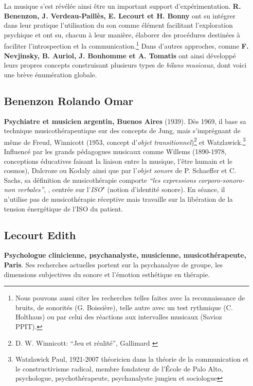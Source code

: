 	 La musique s'est révélée ainsi être un important support
         d'expérimentation. \textbf{R. Benenzon, J. Verdeau-Paillès, E.
         Lecourt et H. Bonny} ont su intégrer dans leur pratique l'utilisation du son comme
         élément facilitant l'exploration psychique et 
         ont su, chacun à leur manière, élaborer des procédures destinées à faciliter
         l'introspection et la communication.\footnote{Nous pouvons aussi citer les recherches telles faites avec la reconnaissance de
bruits, de sonorités (G. Boissière), telle autre avec un test rythmique
(C. Holthaus) ou par celui
des réactions aux intervalles musicaux (Savioz PPIT).} Dans d'autres approches, comme \textbf{F. Nevjinsky, B. Auriol, J. Bonhomme
           et A. Tomatis }ont ainsi développé leurs propres
           concepts construisant plusieurs types de \emph{bilans musicaux},
           dont voici une brève énumération globale.
           

          \subsection{Benenzon Rolando Omar} 
	\textbf{ Psychiatre et
    musicien argentin, Buenos Aires} (1939).
	  \label{benenzon}
	  Dès 1969, il base sa technique 
	  musicothérapeutique sur des concepts 
	  de Jung, mais s'imprégnant de même de Freud, Winnicott
          (1953, concept d'\textit{objet transitionnel})\footnote{D. W. Winnicott: ``Jeu et
            réalité'', Gallimard \autocite{winnicott} } et Watzlawick.\footnote{ Watzlawick Paul, 1921-2007  théoricien dans la théorie de la communication et le constructivisme radical, membre fondateur de l'École de Palo Alto, psychologue, psychothérapeute, psychanalyste jungien et sociologue} 
	  Influencé par les grands  pédagogues musicaux comme
          Willems (1890-1978, conceptions éducatives faisant la liaison
          entre la musique, l'être humain et le cosmos),
          Dalcroze ou Kodaly ainsi que par l'\textit{objet sonore} de
          P. Schaeffer
          et C. Sachs, sa définition de musicothérapie comporte  
	  \emph{\textsl{ ``les expressions corporo-sonoro-non
              verbales''}}, \autocite{benenzon:musicotherapie},
	  centrée sur l'\textit{ISO}" (notion
          d'identité sonore). En séance, il n'utilise pas de
          musicothérapie réceptive mais travaille sur la libération de
          la tension énergétique de l'ISO du patient.

        \subsection{Lecourt Edith}
      \textbf{Psychologue clinicienne,
          psychanalyste, musicienne, musicothérapeute, Paris}. Ses recherches
        actuelles portent sur la psychanalyse de groupe, les
        dimensions subjectives du sonore  et l'émotion esthétique en
        thérapie.
        
